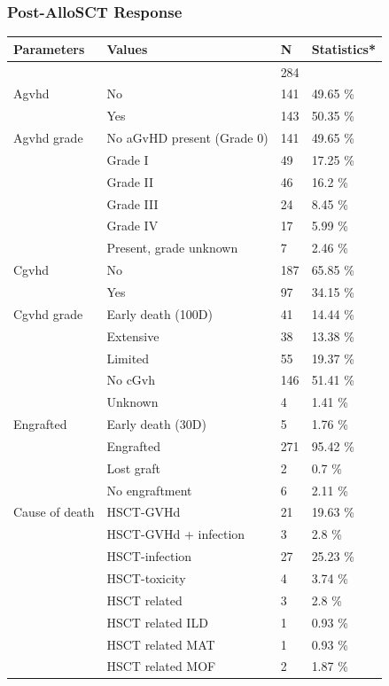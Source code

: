 \documentclass[a4paper,11pt] {article}
\begin{document}
\subsubsection{Post-AlloSCT Response}
\begin{longtable}{llll}
  \hline
Parameters & Values & N & Statistics* \\ 
  \hline
 &  & 284 &  \\ 
  Agvhd & No & 141 & 49.65 \% \\ 
   & Yes & 143 & 50.35 \% \\ 
  Agvhd grade & No aGvHD present (Grade 0) & 141 & 49.65 \% \\ 
   & Grade I & 49 & 17.25 \% \\ 
   & Grade II & 46 & 16.2 \% \\ 
   & Grade III & 24 & 8.45 \% \\ 
   & Grade IV & 17 & 5.99 \% \\ 
   & Present, grade unknown & 7 & 2.46 \% \\ 
  Cgvhd & No & 187 & 65.85 \% \\ 
   & Yes & 97 & 34.15 \% \\ 
  Cgvhd grade & Early death (100D) & 41 & 14.44 \% \\ 
   & Extensive & 38 & 13.38 \% \\ 
   & Limited & 55 & 19.37 \% \\ 
   & No cGvh & 146 & 51.41 \% \\ 
   & Unknown & 4 & 1.41 \% \\ 
  Engrafted & Early death (30D) & 5 & 1.76 \% \\ 
   & Engrafted & 271 & 95.42 \% \\ 
   & Lost graft & 2 & 0.7 \% \\ 
   & No engraftment & 6 & 2.11 \% \\ 
  Cause of death & HSCT-GVHd & 21 & 19.63 \% \\ 
   & HSCT-GVHd + infection & 3 & 2.8 \% \\ 
   & HSCT-infection & 27 & 25.23 \% \\ 
   & HSCT-toxicity & 4 & 3.74 \% \\ 
   & HSCT related & 3 & 2.8 \% \\ 
   & HSCT related ILD & 1 & 0.93 \% \\ 
   & HSCT related MAT & 1 & 0.93 \% \\ 
   & HSCT related MOF & 2 & 1.87 \% \\ 

\end{longtable}
\end{document}
